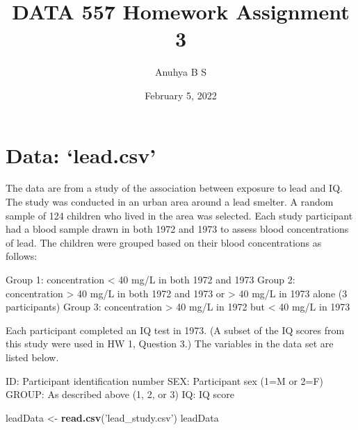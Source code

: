 \documentclass[
]{article}
\title{DATA 557 Homework Assignment 3}
\author{Anuhya B S}
\date{February 5, 2022}
\newenvironment{Shaded}{\begin{snugshade}}{\end{snugshade}}
\newcommand{\KeywordTok}[1]{\textcolor[rgb]{0.13,0.29,0.53}{\textbf{#1}}}
\newcommand{\NormalTok}[1]{#1}
\newcommand{\StringTok}[1]{\textcolor[rgb]{0.31,0.60,0.02}{#1}}
\begin{document}
\maketitle

\hypertarget{data-lead.csv}{%
\section{Data: `lead.csv'}\label{data-lead.csv}}

The data are from a study of the association between exposure to lead
and IQ. The study was conducted in an urban area around a lead smelter.
A random sample of 124 children who lived in the area was selected. Each
study participant had a blood sample drawn in both 1972 and 1973 to
assess blood concentrations of lead. The children were grouped based on
their blood concentrations as follows:

Group 1: concentration \textless{} 40 mg/L in both 1972 and 1973 Group
2: concentration \textgreater{} 40 mg/L in both 1972 and 1973 or
\textgreater{} 40 mg/L in 1973 alone (3 participants) Group 3:
concentration \textgreater{} 40 mg/L in 1972 but \textless{} 40 mg/L in
1973

Each participant completed an IQ test in 1973. (A subset of the IQ
scores from this study were used in HW 1, Question 3.) The variables in
the data set are listed below.

ID: Participant identification number SEX: Participant sex (1=M or 2=F)
GROUP: As described above (1, 2, or 3) IQ: IQ score

\begin{Shaded}
\begin{Highlighting}[]
\NormalTok{leadData <-}\StringTok{ }\KeywordTok{read.csv}\NormalTok{(}\StringTok{'lead_study.csv'}\NormalTok{)}
\NormalTok{leadData}
\end{Highlighting}
\end{Shaded}
\end{document}
